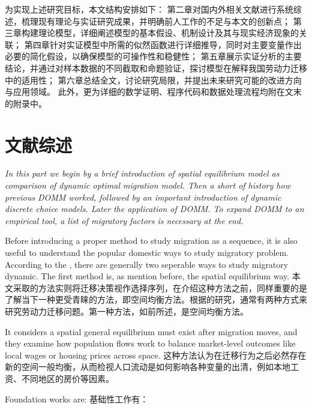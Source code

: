 \documentclass[a4paper,12pt,oneside]{book} %
\begin{document}
为实现上述研究目标，本文结构安排如下：  
第二章对国内外相关文献进行系统综述，梳理现有理论与实证研究成果，并明确前人工作的不足与本文的创新点；  
第三章构建理论模型，详细阐述模型的基本假设、机制设计及其与现实经济现象的关联；  
第四章针对实证模型中所需的似然函数进行详细推导，同时对主要变量作出必要的简化假设，以确保模型的可操作性和稳健性；  
第五章展示实证分析的主要结论，并通过对样本数据的不同截取和命题验证，探讨模型在解释我国劳动力迁移中的适用性；  
第六章总结全文，讨论研究局限，并提出未来研究可能的改进方向与应用领域。  
此外，更为详细的数学证明、程序代码和数据处理流程均附在文末的附录中。



\chapter{文献综述}

\begin{center}
  \textit{
    In this part we begin by a brief introduction of spatial equilibrium model as comparison of dynamic optimal migration model. Then a short of history how previous DOMM worked, followed by an important introduction of dynamic discrete choice models. Later the application of DOMM. To expand DOMM to an empirical tool, a list of migratory factors is necessary at the end.
  }
\end{center}


Before introducing a proper method to study migration as a sequence, it is also useful to understand the popular domestic ways to study migratory problem. According to the \cite{jiaEconomicsInternalMigration2023}, there are generally two seperable ways to study migratory dynamic. The first method is, as mention before, the spatial equilibrium way. 
本文采取的方法实则将迁移决策视作选择序列，在介绍这种方法之前，同样重要的是了解当下一种更受青睐的方法，即空间均衡方法。根据\cite{jiaEconomicsInternalMigration2023}的研究，通常有两种方式来研究劳动力迁移问题。第一种方法，如前所述，是空间均衡方法。

It considers a spatial general equilibrium must exist after migration moves, and they examine how population flows work to balance market-level outcomes like local wages or housing  prices across space.
这种方法认为在迁移行为之后必然存在新的空间一般均衡，从而检视人口流动是如何影响各种变量的出清，例如本地工资、不同地区的房价等因素。

Foundation works are:
基础性工作有：
\end{document}
